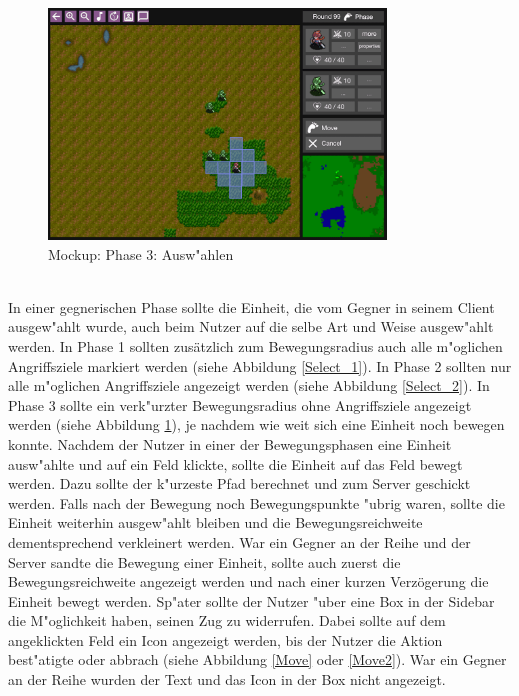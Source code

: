 \documentclass[12pt, titlepage]{scrartcl}
\newcounter{subsubsubsection}[subsubsection]
\begin{document}
			        \begin{figure}[H] 
    				    \centering
    				    \includegraphics[width=0.8\textwidth]{images/mockups/Select2.png}
    				    \caption{Mockup: Phase 3: Ausw"ahlen}
    				    \label{Select_3}
			        \end{figure} 
		            \ \\ In einer gegnerischen Phase sollte die Einheit, die vom Gegner in seinem Client ausgew"ahlt wurde, auch beim Nutzer auf die selbe Art und Weise ausgew"ahlt werden. In Phase 1 sollten zus\"atzlich zum Bewegungsradius auch alle m"oglichen Angriffsziele markiert werden (siehe Abbildung \ref{Select_1}). In Phase 2 sollten nur alle m"oglichen Angriffsziele angezeigt werden (siehe Abbildung \ref{Select_2}). In Phase 3 sollte ein verk"urzter Bewegungsradius ohne Angriffsziele angezeigt werden (siehe Abbildung \ref{Select_3}), je nachdem wie weit sich eine Einheit noch bewegen konnte.
                    Nachdem der Nutzer in einer der Bewegungsphasen eine Einheit ausw"ahlte und auf ein Feld klickte, sollte die Einheit auf das Feld bewegt werden. Dazu sollte der k"urzeste Pfad berechnet und zum Server geschickt werden. Falls nach der Bewegung noch Bewegungspunkte "ubrig waren, sollte die Einheit weiterhin ausgew"ahlt bleiben und die Bewegungsreichweite dementsprechend verkleinert werden. War ein Gegner an der Reihe und der Server sandte die Bewegung einer Einheit, sollte auch zuerst die Bewegungsreichweite angezeigt werden und nach einer kurzen Verz\"ogerung die Einheit bewegt werden. Sp"ater sollte der Nutzer "uber eine Box in der Sidebar die M"oglichkeit haben, seinen Zug zu widerrufen. Dabei sollte auf dem angeklickten Feld ein Icon angezeigt werden, bis der Nutzer die Aktion best"atigte oder abbrach (siehe Abbildung \ref{Move} oder \ref{Move2}). War ein Gegner an der Reihe wurden der Text und das Icon in der Box nicht angezeigt.
\end{document}
